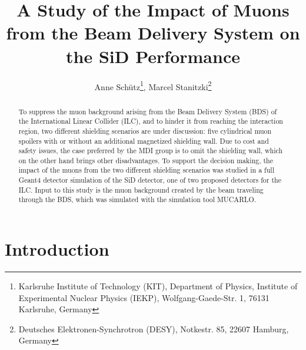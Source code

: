\documentclass[12pt]{article}
\begin{document}

\title{A Study of the Impact of Muons from the Beam Delivery System on the SiD Performance}

\author{Anne Sch\"utz\footnote{Karlsruhe Institute of Technology (KIT), Department of Physics, Institute of Experimental Nuclear Physics (IEKP), Wolfgang-Gaede-Str. 1, 76131 Karlsruhe, Germany}, Marcel Stanitzki\footnote{Deutsches Elektronen-Synchrotron (DESY), Notkestr. 85, 22607 Hamburg, Germany}}

\maketitle

\linenumbers

\begin{abstract}
To suppress the muon background arising from the Beam Delivery System (BDS) of the International Linear Collider (ILC), and to hinder it from reaching the interaction region, two different shielding scenarios are under discussion: five cylindrical muon spoilers with or without an additional magnetized shielding wall.
Due to cost and safety issues, the case preferred by the MDI group is to omit the shielding wall, which on the other hand brings other disadvantages.
To support the decision making, the impact of the muons from the two different shielding scenarios was studied in a full Geant4 detector simulation of the SiD detector, one of two proposed detectors for the ILC. 
Input to this study is the muon background created by the beam traveling through the BDS, which was simulated with the simulation tool MUCARLO.
\end{abstract}


\section{Introduction}
\label{sec:introduction}
\end{document}
